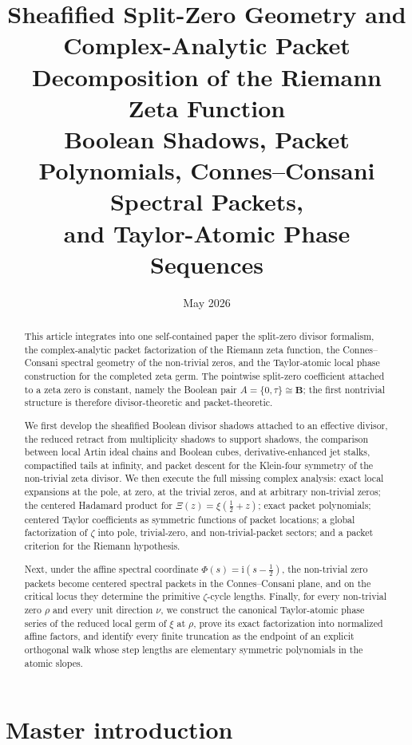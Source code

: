 \documentclass[11pt,a4paper]{article}
\title{Sheafified Split-Zero Geometry and Complex-Analytic Packet Decomposition of the Riemann Zeta Function\\
Boolean Shadows, Packet Polynomials, Connes--Consani Spectral Packets,\\
and Taylor-Atomic Phase Sequences}
\author{}
\date{May 2026}
\numberwithin{equation}{section}
\theoremstyle{definition}
\theoremstyle{remark}
\newcommand{\BB}{\mathbf B}
\newcommand{\taup}{\tau}
\newcommand{\ii}{\mathrm i}
\begin{document}
\maketitle

\begin{abstract}
This article integrates into one self-contained paper the split-zero divisor formalism, the complex-analytic packet factorization of the Riemann zeta function, the Connes--Consani spectral geometry of the non-trivial zeros, and the Taylor-atomic local phase construction for the completed zeta germ.  The pointwise split-zero coefficient attached to a zeta zero is constant, namely the Boolean pair $A=\{0,\taup\}\cong\BB$; the first nontrivial structure is therefore divisor-theoretic and packet-theoretic.

We first develop the sheafified Boolean divisor shadows attached to an effective divisor, the reduced retract from multiplicity shadows to support shadows, the comparison between local Artin ideal chains and Boolean cubes, derivative-enhanced jet stalks, compactified tails at infinity, and packet descent for the Klein-four symmetry of the non-trivial zeta divisor.  We then execute the full missing complex analysis: exact local expansions at the pole, at zero, at the trivial zeros, and at arbitrary non-trivial zeros; the centered Hadamard product for $\Xi(z)=\xi(\tfrac12+z)$; exact packet polynomials; centered Taylor coefficients as symmetric functions of packet locations; a global factorization of $\zeta$ into pole, trivial-zero, and non-trivial-packet sectors; and a packet criterion for the Riemann hypothesis.

Next, under the affine spectral coordinate $\Phi(s)=\ii(s-\tfrac12)$, the non-trivial zero packets become centered spectral packets in the Connes--Consani plane, and on the critical locus they determine the primitive $\zeta$-cycle lengths.  Finally, for every non-trivial zero $\rho$ and every unit direction $\nu$, we construct the canonical Taylor-atomic phase series of the reduced local germ of $\xi$ at $\rho$, prove its exact factorization into normalized affine factors, and identify every finite truncation as the endpoint of an explicit orthogonal walk whose step lengths are elementary symmetric polynomials in the atomic slopes.
\end{abstract}

\tableofcontents

\section*{Master introduction}
\end{document}
